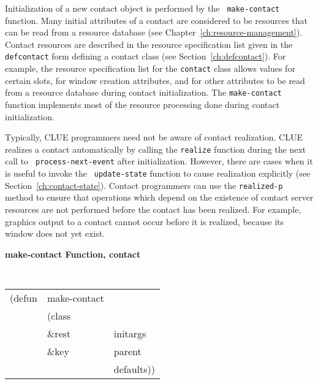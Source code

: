 Initialization of a new
contact object is performed by the {\tt
make-contact} function.
Many initial attributes of a contact are considered to be
resources that can be read from a resource database
(see Chapter~\ref{ch:resource-management}).
Contact resources are described in the resource specification list given in the
{\tt defcontact} form defining a contact class (see
Section~\ref{ch:defcontact}).  
For example, the resource specification list for the {\tt contact} class allows values for
certain slots, for window creation attributes, and for other
attributes to be read from a resource database during contact
initialization.
The {\tt make-contact} function implements most of the resource processing done during
contact initialization\footnotemark{}. 

Typically, CLUE programmers need not be aware of contact realization.  CLUE
realizes a contact automatically by calling the {\tt realize}
function during the next call to {\tt
process-next-event} after initialization.
However, there are cases when it is useful to invoke the {\tt
update-state} function to cause realization
explicitly (see Section~\ref{ch:contact-state}).  Contact programmers can use
the {\tt realized-p} method to ensure that operations
which depend on the existence of contact server resources are not performed
before the contact has been realized.  For example, graphics output to a contact
cannot occur before it is realized, because its window does not yet exist.

{\large {\bf make-contact \hfill Function, contact}}
\begin{flushright} \parbox[t]{6.125in}{
\tt
\begin{tabular}{lll}
\raggedright
(defun & make-contact & \\
& (class\\
& \&rest & initargs\\
& \&key & parent\\
&       & defaults))
\end{tabular}
\rm

}\end{flushright}


